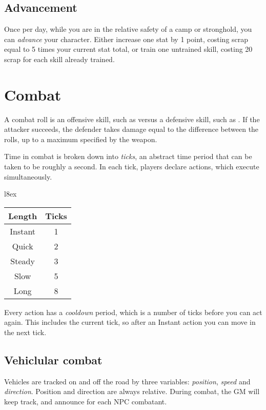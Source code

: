 \documentclass[10pt, a4paper, twocolumn]{article}
\begin{document}
\subsection{Advancement}
Once per day, while you are in the relative safety of a camp or stronghold, you
can \emph{advance} your character. Either increase one stat by 1 point,
costing scrap equal to 5 times your current stat total, or train one untrained
skill, costing 20 scrap for each skill already trained.

\section{Combat}
A combat roll is an offensive skill, such as  versus
a defensive skill, such as . If the attacker succeeds, the
defender takes damage equal to the difference between the rolls, up to a maximum
specified by the weapon.

Time in combat is broken down into \emph{ticks}, an abstract time period that
can be taken to be roughly a second. In each tick, players declare actions,
which execute simultaneously.

\begin{wraptable}[5]{l}{8ex}
  \small
\vspace*{-4ex}
\hspace*{-4ex}
\begin{tabular}{cc}
  Length   & Ticks \\
  \hline 
  Instant  & 1     \\
  Quick    & 2     \\
  Steady   & 3     \\
  Slow     & 5     \\
  Long     & 8
\end{tabular}
\end{wraptable}

Every action has a \emph{cooldown} period, which is a number of ticks before you
can act again. This includes the current tick, so after an Instant action you
can move in the next tick.

\subsection{Vehiclular combat}
Vehicles are tracked on and off the road by three variables: \emph{position},
\emph{speed} and \emph{direction}. Position and direction are always relative.
During combat, the GM will keep track, and announce for each NPC combatant.
\end{document}

